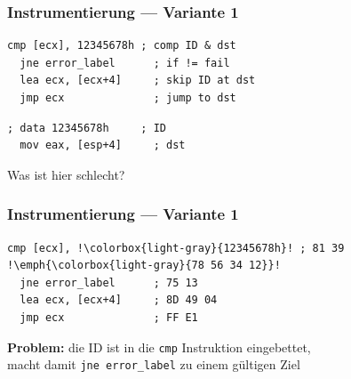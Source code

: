 \documentclass[mathserif,slidestop,compress,red]{beamer}
\begin{document}
\begin{frame}[fragile]
  \frametitle{Instrumentierung — Variante 1}
  \begin{lstlisting}[title=Quelle]
  cmp [ecx], 12345678h ; comp ID & dst
  jne error_label      ; if != fail
  lea ecx, [ecx+4]     ; skip ID at dst
  jmp ecx              ; jump to dst
  \end{lstlisting}
  \begin{lstlisting}[title=Ziel]
  ; data 12345678h     ; ID
  mov eax, [esp+4]     ; dst
  \end{lstlisting}
  \pause
  \begin{flushright}
    Was ist hier schlecht?
  \end{flushright}
\end{frame}


\begin{frame}[fragile]
  \frametitle{Instrumentierung — Variante 1}
  \begin{lstlisting}[title=Quelle,escapechar=!]
  cmp [ecx], !\colorbox{light-gray}{12345678h}! ; 81 39 !\emph{\colorbox{light-gray}{78 56 34 12}}!
  jne error_label      ; 75 13
  lea ecx, [ecx+4]     ; 8D 49 04
  jmp ecx              ; FF E1
  \end{lstlisting}
  \textbf{Problem:} die ID ist in die \texttt{cmp} Instruktion eingebettet, \\ macht
  damit \texttt{jne error\_label} zu einem gültigen Ziel
\end{frame}
\end{document}
